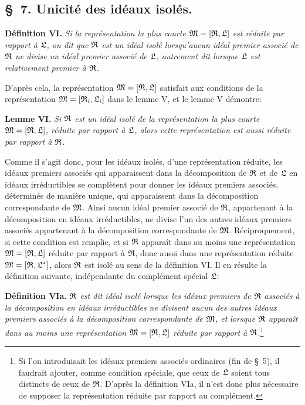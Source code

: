 
\setcounter{footnote}{29}
\subsection*{\S~7. Unicité des idéaux isolés.}

\textbf{Définition VI.} \emph{Si la représentation la plus courte $\mathfrak{M}=[\mathfrak{R},\mathfrak{L}]$ est réduite par rapport à $\mathfrak{L}$, on dit que $\mathfrak{R}$ est un idéal isolé lorsqu'aucun idéal premier associé de $\mathfrak{R}$ ne divise un idéal premier associé de $\mathfrak{L}$, autrement dit lorsque $\mathfrak{L}$ est relativement premier à $\mathfrak{R}$.}

D'après cela, la représentation $\mathfrak{M}=[\mathfrak{R},\mathfrak{L}]$ satisfait aux conditions de la représentation $\mathfrak{M}=[\mathfrak{R}_i,\mathfrak{L}_i]$ dans le lemme V, et le lemme V démontre:

\textbf{Lemme VI.} \emph{Si $\mathfrak{R}$ est un idéal isolé de la représentation la plus courte $\mathfrak{M}=[\mathfrak{R},\mathfrak{L}]$, réduite par rapport à $\mathfrak{L}$, alors cette représentation est aussi réduite par rapport à $\mathfrak{R}$.}

Comme il s'agit donc, pour les idéaux isolés, d'une représentation réduite, les idéaux premiers associés qui apparaissent dans la décomposition de $\mathfrak{R}$ et de $\mathfrak{L}$ en idéaux irréductibles se complètent pour donner les idéaux premiers associés, déterminés de manière unique, qui apparaissent dans la décomposition correspondante de $\mathfrak{M}$. Ainsi aucun idéal premier associé de $\mathfrak{R}$, appartenant à la décomposition en idéaux irréductibles, ne divise l'un des autres idéaux premiers associés appartenant à la décomposition correspondante de $\mathfrak{M}$. Réciproquement, si cette condition est remplie, et si $\mathfrak{R}$ apparaît dans au moins une représentation $\mathfrak{M}=[\mathfrak{R},\mathfrak{L}]$ réduite par rapport à $\mathfrak{R}$, donc aussi dans une représentation réduite $\mathfrak{M}=[\mathfrak{R},\mathfrak{L}^*]$, alors $\mathfrak{R}$ est isolé au sens de la définition VI. Il en résulte la définition suivante, indépendante du complément spécial $\mathfrak{L}$:

\textbf{Définition VIa.} \emph{$\mathfrak{R}$ est dit idéal isolé lorsque les idéaux premiers de $\mathfrak{R}$ associés à la décomposition en idéaux irréductibles ne divisent aucun des autres idéaux premiers associés à la décomposition correspondante de $\mathfrak{M}$, et lorsque $\mathfrak{R}$ apparaît dans au moins une représentation $\mathfrak{M}=[\mathfrak{R},\mathfrak{L}]$ réduite par rapport à $\mathfrak{R}$.}\footnote{Si l'on introduisait les idéaux premiers associés ordinaires (fin de \S~5), il faudrait ajouter, comme condition spéciale, que ceux de $\mathfrak{L}$ soient tous distincts de ceux de $\mathfrak{R}$. D'après la définition VIa, il n'est donc plus nécessaire de supposer la représentation réduite par rapport au complément.}

